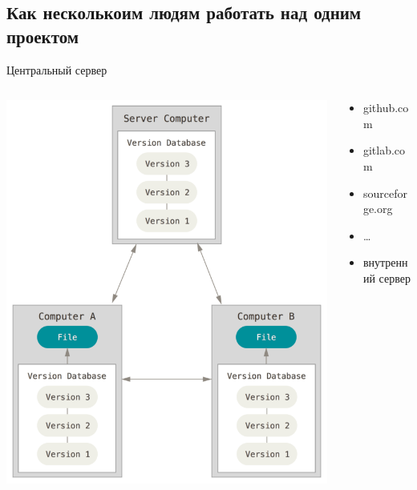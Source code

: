 \documentclass[presentation]{beamer}
\begin{document}
\subsection{Как несколькоим людям работать над одним проектом}
\label{sec:org9d31fd6}
\begin{frame}[label={sec:org9f0196e}]{Центральный сервер}
\begin{columns}
\begin{column}{0.65\columnwidth}
\begin{center}
\includegraphics[height=0.8\textheight]{./01_vcs_00_distributed_vcs.png}
\end{center}
\end{column}

\begin{column}{0.35\columnwidth}
\begin{itemize}
\item github.com
\item \alert{gitlab.com}
\item sourceforge.org
\item \ldots{}
\item внутренний сервер
\end{itemize}
\end{column}
\end{columns}
\end{frame}
\end{document}
